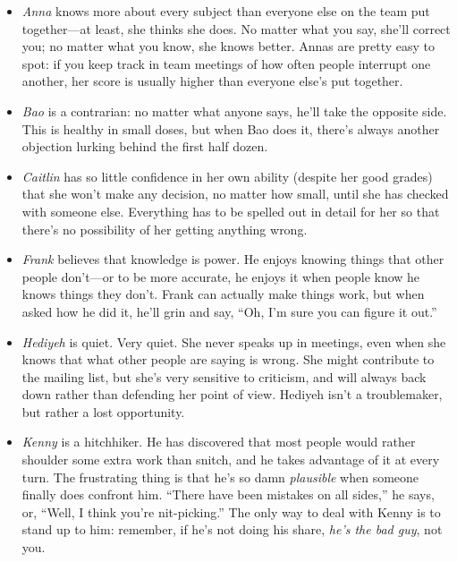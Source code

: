 \documentclass{report}
\begin{document}
\begin{itemize}

  \item \emph{Anna} knows more about every subject than everyone else
  on the team put together---at least, she thinks she does.  No matter
  what you say, she'll correct you; no matter what you know, she knows
  better.  Annas are pretty easy to spot: if you keep track in team
  meetings of how often people interrupt one another, her score is
  usually higher than everyone else's put together.

  \item \emph{Bao} is a contrarian: no matter what anyone says, he'll
  take the opposite side.  This is healthy in small doses, but when
  Bao does it, there's always another objection lurking behind the
  first half dozen.

  \item \emph{Caitlin} has so little confidence in her own ability
  (despite her good grades) that she won't make any decision, no
  matter how small, until she has checked with someone else.
  Everything has to be spelled out in detail for her so that there's
  no possibility of her getting anything wrong.

  \item \emph{Frank} believes that knowledge is power.  He enjoys
  knowing things that other people don't---or to be more accurate, he
  enjoys it when people know he knows things they don't.  Frank can
  actually make things work, but when asked how he did it, he'll grin
  and say, ``Oh, I'm sure you can figure it out.''

  \item \emph{Hediyeh} is quiet.  Very quiet.  She never speaks up in
  meetings, even when she knows that what other people are saying is
  wrong.  She might contribute to the mailing list, but she's very
  sensitive to criticism, and will always back down rather than
  defending her point of view.  Hediyeh isn't a troublemaker, but
  rather a lost opportunity.

  \item \emph{Kenny} is a hitchhiker.  He has discovered that most
  people would rather shoulder some extra work than snitch, and he
  takes advantage of it at every turn.  The frustrating thing is that
  he's so damn \emph{plausible} when someone finally does confront
  him.  ``There have been mistakes on all sides,'' he says, or,
  ``Well, I think you're nit-picking.''  The only way to deal with
  Kenny is to stand up to him: remember, if he's not doing his share,
  \emph{he's the bad guy}, not you.


\end{itemize}
\end{document}
